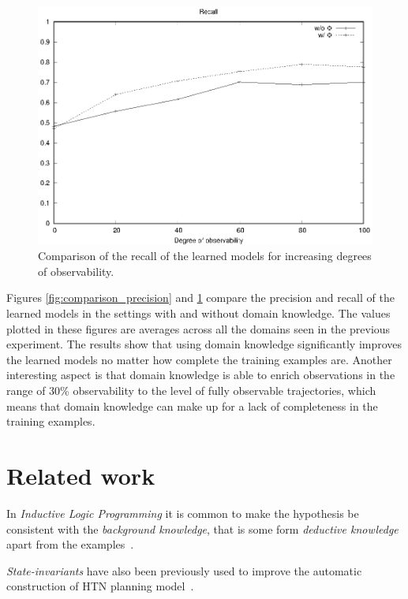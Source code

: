 \documentclass{article}
\begin{document}
\begin{figure}[hbt!]
	\centering
	\includegraphics[width=\linewidth]{figures/comparison_recall.eps}
	\caption{Comparison of the recall of the learned models for increasing degrees of observability.}
	\label{fig:comparison_recall}
\end{figure}

Figures \ref{fig:comparison_precision} and \ref{fig:comparison_recall} compare the precision and recall of the learned models in the settings with and without domain knowledge. The values plotted in these figures are averages across all the domains seen in the previous experiment. The results show that using domain knowledge significantly improves the learned models no matter how complete the training examples are. Another interesting aspect is that domain knowledge is able to enrich observations in the range of 30\% observability to the level of fully observable trajectories, which means that domain knowledge can make up for a lack of completeness in the training examples.

\section{Related work}
\label{sec:related}
In {\em Inductive Logic Programming} it is common to make the hypothesis be consistent with the {\em background knowledge}, that is some form {\em deductive knowledge} apart from the examples~\cite{muggleton1994inductive}.

{\em State-invariants} have also been previously used to improve the automatic construction of HTN planning model~\cite{lotinac2016constructing}.
\end{document}
